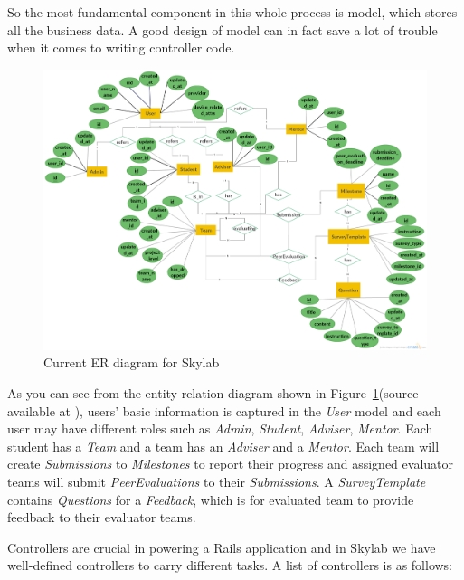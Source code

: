 So the most fundamental component in this whole process is model, which stores all the business data. A good design of model can in fact save a lot of trouble when it comes to writing controller code.

\begin{figure}[h]
  \centering
  \includegraphics[width=\textwidth]{Images/Skylab_ER.png}
  \caption{Current ER diagram for Skylab}
  \label{fig:SkylabER}
\end{figure}

As you can see from the entity relation diagram shown in Figure~\ref{fig:SkylabER}(source available at \cite{citationERSource}), users' basic information is captured in the \textit{User} model and each user may have different roles such as \textit{Admin}, \textit{Student}, \textit{Adviser}, \textit{Mentor}. Each student has a \textit{Team} and a team has an \textit{Adviser} and a \textit{Mentor}. Each team will create \textit{Submissions} to \textit{Milestones} to report their progress and assigned evaluator teams will submit \textit{PeerEvaluations} to their \textit{Submissions}. A \textit{SurveyTemplate} contains \textit{Questions} for a \textit{Feedback}, which is for evaluated team to provide feedback to their evaluator teams.

Controllers are crucial in powering a Rails application and in Skylab we have well-defined controllers to carry different tasks. A list of controllers is as follows:

